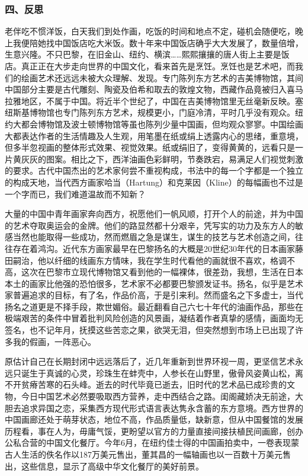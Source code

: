 \documentclass{article}
\begin{document}
\subsubsection{四、反思}
老伴吃不惯洋饭，白天我们到处作画，吃饭的时间和地点不定，碰机会随便吃，晚上我便陪她找中国饭店吃大米饭。数十年来中国饭店确乎大大发展了，数量倍增，生意兴隆。不只巴黎，在旧金山、纽约、横滨……熙熙攘攘的唐人街上主要是饭店。真正正在大步走向世界的中国文化，看来首先是烹饪。烹饪也是艺术吧，而我们的绘画艺术还远远未被大众理解、发现。专门陈列东方艺术的吉美博物馆，其间中国部分主要是古代雕刻、陶瓷及伯希和取去的敦煌文物，西藏作品竟被归入喜马拉雅地区，不属于中国。将近半个世纪了，中国在吉美博物馆里无丝毫新反映。塞纽斯基博物馆也专门陈列东方艺术，规模更小，门庭冷清，平时几乎没有观众。纽约大都会博物馆及波士顿博物馆等虽也陈列少量中国画，但均观众寥寥。中国绘画大都表达作者的生活情趣及人生观，用笔墨在纸或绢上透露内心的思绪，重意境，但多半忽视画的整体形式效果、视觉效果。纸或绢旧了，变得黄黄的，远看只是一片黄灰灰的图案。相比之下，西洋油画色彩鲜明，节奏跌宕，易满足人们视觉刺激的要求。古代中国杰出的艺术家何尝不重视构成，书法中的每一个字都是一个独立的构成天地，当代西方画家哈当（Hartung）和克莱因（Kline）的每幅画也不过是一个字而已，我们难道温故而不知新？

大量的中国中青年画家奔向西方，祝愿他们一帆风顺，打开个人的前途，并为中国的艺术夺取奥运会的金牌。他们的路显然都十分艰辛，凭写实的功力及东方人的敏感当然也能取得一些成功，然而燃眉之急是谋生，谋生的技艺与艺术创造之间，往往存在着鸿沟。近代东方画家最早在巴黎扬名的大概是20世纪30年代的日本画家藤田嗣治，他以纤细的线画东方情味，我在学生时代看他的画就很不喜欢，格调不高，这次在巴黎市立现代博物馆又看到他的一幅裸体，很差劲，我想，生活在日本本土的画家比他强的恐怕很多，艺术家不必都要巴黎颁发证书。扬名，似乎是艺术家普遍追求的目标，有了名，作品价高，于是引来利。然而盛名之下多虚士，当代扬名之道更是不择手段，欺世媚俗。最近翻看自己六七十年代的油画作品，那些在极端艰苦的条件中冒着批判风险创造的风景画，凝结着作者真挚的感情，画面均无签名，也不记年月，抚摸这些苦恋之果，欲哭无泪，但突然想到市场上已出现了许多我的假画，一阵恶心。

原估计自己在长期封闭中远远落后了，近几年重新到世界环视一周，更坚信艺术永远只诞生于真诚的心灵，珍珠生在蚌壳中，人参长在山野里，傲骨风姿黄山松，离不开贫瘠苦寒的石头峰。逝去的时代毕竟已逝去，旧时代的艺术品已成珍贵的文物，今日中国艺术必然要吸取西方营养，走中西结合之路。闺阁藏娇决无前途，大胆去追求异国之恋，采集西方现代形式语言表达隽永含蓄的东方意境。西方世界的中国画廊还处于萌芽状态，地位不高，作品质量低，缺新意，但从中国餐馆的发展历程看，事在人为，毋庸气馁，更盼望以官方的力量直接间接扶植民间画廊，创办公私合营的中国文化餐厅。今年6月，在纽约佳士得的中国画拍卖中，一卷表现蒙古人生活的佚名作以187万美元售出，董其昌的一幅轴画也以一百数十万美元售出，这些信息，显示了高级中华文化餐厅的美好前景。
\end{document}
